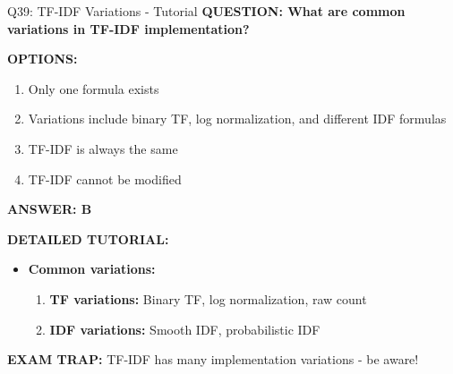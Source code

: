 \documentclass[8pt]{beamer}
\begin{document}
	\begin{frame}{Q39: TF-IDF Variations - Tutorial}
		\fontsize{6.5}{7.5}\selectfont
		\textbf{QUESTION: What are common variations in TF-IDF implementation?}
		
		\vspace{0.1cm}
		\textbf{OPTIONS:}
		\begin{enumerate}
			\item Only one formula exists
			\item Variations include binary TF, log normalization, and different IDF formulas
			\item TF-IDF is always the same
			\item TF-IDF cannot be modified
		\end{enumerate}
		
		\vspace{0.1cm}
		\textcolor{myblue}{\textbf{ANSWER: B}}
		
		\vspace{0.1cm}
		\textbf{DETAILED TUTORIAL:}
		\begin{itemize}
			\item \textbf{Common variations:}
			\begin{enumerate}
				\item \textbf{TF variations:} Binary TF, log normalization, raw count
				\item \textbf{IDF variations:} Smooth IDF, probabilistic IDF
			\end{enumerate}
		\end{itemize}
		
		\textcolor{myred}{\textbf{EXAM TRAP:}} TF-IDF has \textcolor{myblue}{many implementation variations} - be aware!
	\end{frame}
	
\end{document}
